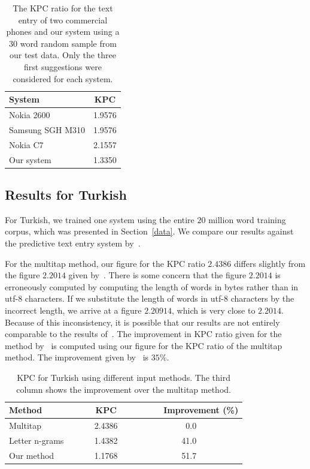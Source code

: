 \documentclass{llncs}
\begin{document}
\begin{table}
\caption{The KPC ratio for the text entry of two commercial phones and
  our system using a $30$ word random sample from our test data. Only
  the three first suggestions were considered for each system.}\label{mobile-phone-kpc}
\begin{center}
\begin{tabular}{lc}
\hline
System & KPC\\
\hline
Nokia 2600       & 1.9576\\
Samsung SGH M310 & 1.9576\\
Nokia C7         & 2.1557\\
Our system       & 1.3350\\
\hline
\end{tabular}
\end{center}
\end{table}

\subsection{Results for Turkish}

For Turkish, we trained one system using the entire $20$ million word
training corpus, which was presented in Section~\ref{data}. We compare
our results against the predictive text entry system
by~\cite{Tantug:2010}.

For the multitap method, our figure for the KPC ratio $2.4386$ differs
slightly from the figure $2.2014$ given by~\cite{Tantug:2010}. There
is some concern that the figure $2.2014$ is erroneously computed by
computing the length of words in bytes rather than in utf-8
characters. If we substitute the length of words in utf-8 characters
by the incorrect length, we arrive at a figure $2.20914$, which is
very close to $2.2014$. Because of this inconsistency, it is possible
that our results are not entirely comparable to the results
of~\cite{Tantug:2010}. The improvement in KPC ratio given for the method
by~\cite{Tantug:2010} is computed using our figure for the KPC ratio
of the multitap method. The improvement given by~\cite{Tantug:2010} is
$35\%$.

\begin{table}
\caption{KPC for Turkish using different input methods. The third
  column shows the improvement over the multitap method.}\label{Turkish-kpc-table}
\begin{center}
\begin{tabular}{lcr}
\hline
Method~~~~& ~~~~KPC~~~~ & ~~~~Improvement (\%)\\
\hline
Multitap                          &  2.4386 &0.0~~~~~~~~~~\\
Letter n-grams~\cite{Tantug:2010} &  1.4382 &41.0~~~~~~~~~~\\
Our method                        &  1.1768 &51.7~~~~~~~~~~\\
\hline
\end{tabular}
\end{center}
\end{table}
\end{document}
